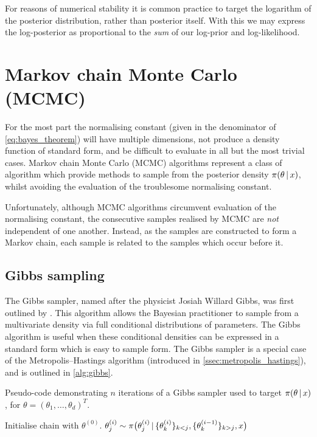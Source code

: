For reasons of numerical stability it is common practice to target the
logarithm of the posterior distribution, rather than posterior itself. With
this we may express the log-posterior as proportional to the \emph{sum} of our
log-prior and log-likelihood.

\section{Markov chain Monte Carlo (MCMC)}
\label{sec:mcmc}

For the most part the normalising constant (given in the denominator of
\cref{eq:bayes_theorem}) will have multiple dimensions, not produce a density
function of standard form, and be difficult to evaluate in all but the most
trivial cases. Markov chain Monte Carlo (MCMC) algorithms represent a class of
algorithm which provide methods to sample from the posterior density
$\pi(\theta \,|\, x)$, whilst avoiding the evaluation of the troublesome
normalising constant.

Unfortunately, although MCMC algorithms circumvent evaluation of the
normalising constant, the consecutive samples realised by MCMC are \emph{not}
independent of one another. Instead, as the samples are constructed to form a
Markov chain, each sample is related to the samples which occur before it.

\subsection{Gibbs sampling}
\label{ssec:gibbs_sampling}

The Gibbs sampler, named after the physicist Josiah Willard Gibbs, was first
outlined by \textcite{geman84}. This algorithm allows the Bayesian practitioner
to sample from a multivariate density via full conditional distributions of
parameters. The Gibbs algorithm is useful when these conditional densities can
be expressed in a standard form which is easy to sample form. The Gibbs sampler
is a special case of the Metropolis--Hastings algorithm (introduced in
\cref{ssec:metropolis_hastings}), and is outlined in \cref{alg:gibbs}.

\begin{algorithm}
  \caption{Pseudo-code demonstrating $n$ iterations of a Gibbs sampler used
    to target $\pi(\theta \,|\, x)$, for $\theta=(\theta_1,\ldots,\theta_d)^T$.}
  \label{alg:gibbs}
  \begin{algorithmic}[1]
    \State Initialise chain with $\theta^{(0)}$.
      \State $\theta_j^{(i)} \sim
        \pi\big(\theta_j^{(i)} \,|\,
          \{ \theta_k^{(i)} \}_{k < j},
          \{ \theta_k^{(i-1) }\}_{k > j}, x\big)$
      \EndFor
    \EndFor
  \end{algorithmic}
\end{algorithm}

